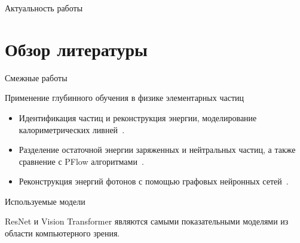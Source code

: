 \documentclass[9pt]{beamer}
\begin{document}
\begin{frame}{Актуальность работы}
    
\end{frame}

\section{Обзор литературы}

\begin{frame}{Смежные работы}
    \begin{block}{Применение глубинного обучения в физике элементарных частиц}
        \begin{itemize}
            \item Идентификация частиц и реконструкция энергии, моделирование калориметрических ливней~\cite{Belayneh_2020}.
            \item Разделение остаточной энергии заряженных и нейтральных частиц, а также сравнение с PFlow алгоритмами~\cite{Di_Bello_2021}.
            \item Реконструкция энергий фотонов с помощью графовых нейронных сетей~\cite{Wemmer_2023}.
        \end{itemize}
    \end{block}
\end{frame}

\begin{frame}{Используемые модели}
    \begin{figure}
        \setcounter{subfigure}{0}
        \centering
        \hskip4pt
    \end{figure}

    \begin{block}{}
        ResNet и Vision Transformer являются самыми показательными моделями из области компьютерного зрения.
    \end{block}
\end{frame}
\end{document}
